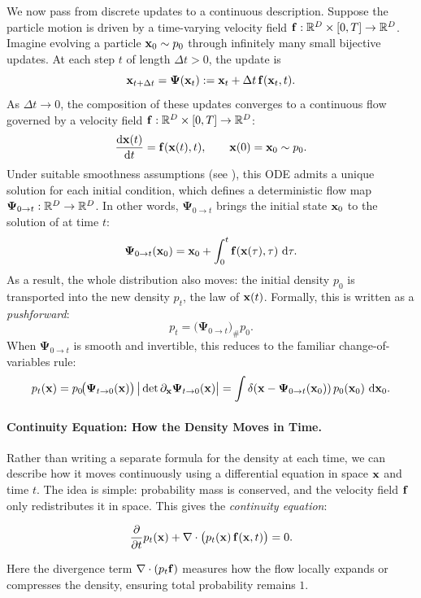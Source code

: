 We now pass from discrete updates to a continuous description.  
Suppose the particle motion is driven by a time-varying velocity field 
${\mathbf{f}}:\mathbb{R}^D \times [0,T]\to \mathbb{R}^D$.  
Imagine evolving a particle ${\mathbf{x}}_0 \sim p_0$ through infinitely many small bijective updates.  
At each step $t$ of length $\Delta t>0$, the update is
\[
{\mathbf{x}}_{t+\Delta t} = \bm{\Psi}({\mathbf{x}}_t) 
:= {\mathbf{x}}_t + \Delta t\, {\mathbf{f}}({\mathbf{x}}_t, t).
\]
As $\Delta t \to 0$, the composition of these updates converges to a continuous flow governed by a velocity field ${\mathbf{f}}:\mathbb{R}^D \times [0,T]\to \mathbb{R}^D$:
\begin{align}\label{eq:ode-f-continuity}
    \frac{\mathop{}\!\mathrm{d} {\mathbf{x}}(t)}{\mathop{}\!\mathrm{d} t} = {\mathbf{f}}({\mathbf{x}}(t), t),
    \qquad {\mathbf{x}}(0) = {\mathbf{x}}_0 \sim p_0.
\end{align}
Under suitable smoothness assumptions (see ), this ODE admits a unique solution for each initial condition, which defines a deterministic flow map 
$\bm{\Psi}_{0\to t}:\mathbb{R}^D \to \mathbb{R}^D$.  
In other words, $\bm{\Psi}_{0\to t}$ brings the initial state ${\mathbf{x}}_0$ to the solution of  at time $t$:
\[
\bm{\Psi}_{0\to t}({\mathbf{x}}_0) 
= {\mathbf{x}}_0 + \int_{0}^{t} {\mathbf{f}}({\mathbf{x}}(\tau), \tau)\,\mathop{}\!\mathrm{d}\tau.
\]
As a result, the whole distribution also moves: the initial density $p_0$ is transported into the new density $p_t$, the law of ${\mathbf{x}}(t)$.  
Formally, this is written as a \emph{pushforward}:
\[
p_t = \big(\bm{\Psi}_{0\to t}\big)_{\#} p_0.
\]
When $\bm{\Psi}_{0\to t}$ is smooth and invertible, this reduces to the familiar change-of-variables rule:
\[
p_t({\mathbf{x}}) 
= p_0\!\big(\bm{\Psi}_{t\to 0}({\mathbf{x}})\big)\,
   \big|\det \partial_{\mathbf{x}}\bm{\Psi}_{t\to 0}({\mathbf{x}})\big|
= \int \delta\!\left({\mathbf{x}} - \bm{\Psi}_{0\to t}({\mathbf{x}}_0)\right) 
   p_0({\mathbf{x}}_0)\,\mathop{}\!\mathrm{d}{\mathbf{x}}_0. 
\]

\paragraph{Continuity Equation: How the Density Moves in Time.}
Rather than writing a separate formula for the density at each time, we can describe how it moves continuously using a differential equation in space ${\mathbf{x}}$ and time $t$.
The idea is simple: probability mass is conserved, and the velocity field ${\mathbf{f}}$ only redistributes it in space.  
This gives the \emph{continuity equation}:
\begin{mdframed}
\begin{align}\label{eq:continuity-cov}
    \frac{\partial}{\partial t} p_t({\mathbf{x}}) 
    + \nabla \cdot \big( p_t({\mathbf{x}})\,{\mathbf{f}}({\mathbf{x}}, t) \big) = 0.
\end{align}
\end{mdframed}
Here the divergence term $\nabla \cdot (p_t {\mathbf{f}})$ measures how the flow locally expands or compresses the density, ensuring total probability remains $1$.

